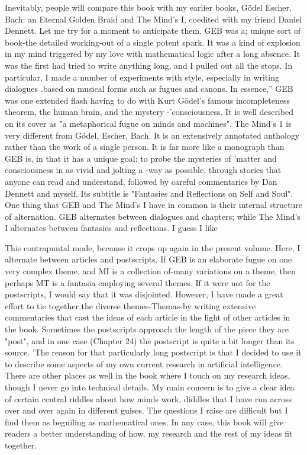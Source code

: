         Inevitably, people will compare this book with my earlier books, Gödel
Escher, Bach: an Eternal Golden Braid and The Mind's I, coedited with my friend
Daniel Dennett. Let me try for a moment to anticipate them.
        GEB was a; unique sort of book-the detailed working-out of a single potent
spark. It was a kind of explosion in my mind triggered by my love with mathematical
logic after a long absence. It was the first had tried to write anything long, and I
pulled out all the stops. In particular, I made a number of experiments with style,
especially in writing dialogues .based on musical forms such as fugues and canons. In
essence,'' GEB was one extended flash having to do with Kurt Gödel’s famous
incompleteness theorem, the human brain, and the mystery -'consciousness. It is well
described on its cover as "a metaphorical fugue on minds and machines".
        The Mind's 1 is very different from Gödel, Escher, Bach. It is an extensively
annotated anthology rather than the work of a single person. It is far more like a
monograph than GEB is, in that it has a unique goal: to probe the mysteries of 'matter
and consciousness in as vivid and jolting a -way as possible, through stories that
anyone can read and understand, followed by careful commentaries by Dan Dennett
and myself. Its subtitle is "Fantasies and Reflections on Self and Soul".
        One thing that GEB and The Mind's I have in common is their internal
structure of alternation. GEB alternates between dialogues and chapters; while The
Mind's I alternates between fantasies and reflections. I guess I like





This contrapuntal mode, because it crops up again in the present volume. Here, I
alternate between articles and postscripts.
        If GEB is an elaborate fugue on one very complex theme, and MI is a
collection of-many variations on a theme, then perhaps MT is a fantasia employing
several themes. If it were not for the postscripts, I would say that it was disjointed.
However, I have made a great effort to tie together the diverse themes-Themas-by
writing extensive commentaries that cast the ideas of each article in the light of other
articles in the book. Sometimes the postscripts approach the length of the piece they
are "post", and in one case (Chapter 24) the postscript is quite a bit longer than its
source.
        'The reason for that particularly long postscript is that I decided to use it to
describe some aspects of my own current research in artificial intelligence. There are
other places as well in the book where I touch on my research ideas, though I never go
into technical details. My main concern is to give a clear idea of certain central riddles
about how minds work, diddles that I have run across over and over again in different
guises. The questions I raise are difficult but I find them as beguiling as mathematical
ones. In any case, this book will give readers a better understanding of how. my
research and the rest of my ideas fit together.


